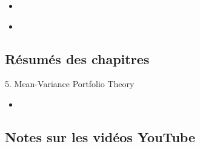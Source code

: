 \begin{ASM_chapter}
\begin{itemize}
	\item	{}
\end{itemize}
\end{ASM_chapter}

\begin{YTB_vids}
\begin{itemize}
	\item	
\end{itemize}
\end{YTB_vids}

\subsection{Résumés des chapitres}

\begin{CHPT_SUMM_AUTO}[label = {L.-5}]{5. Mean-Variance Portfolio Theory}
	\begin{itemize}
		\item	
	\end{itemize}
\end{CHPT_SUMM_AUTO}

\subsection{Notes sur les vidéos YouTube}

